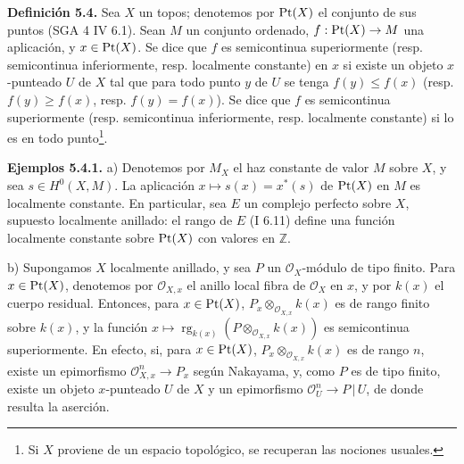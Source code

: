 \providecommand{\sisi}[2]{#2}

\textbf{Definición 5.4.} Sea \(X\) un topos; denotemos por \(\operatorname{Pt}(X)\) el conjunto de sus puntos (SGA 4 IV 6.1). Sean \(M\) un conjunto ordenado, \(f:\operatorname{Pt}(X)\to M\) una aplicación, y \(x\in\operatorname{Pt}(X)\). Se dice que \(f\) es semicontinua superiormente (resp. semicontinua inferiormente, resp. localmente constante) en \(x\) si existe un objeto \(x\)-punteado \(U\) de \(X\) tal que para todo punto \(y\) de \(U\) se tenga \(f(y)\leq f(x)\) (resp. \(f(y)\geq f(x)\), resp. \(f(y)=f(x)\)). Se dice que \(f\) es semicontinua superiormente (resp. semicontinua inferiormente, \sisi{rep.}{resp.} localmente constante) si lo es en todo punto\footnote{Si \(X\) proviene de un espacio topológico, se recuperan las nociones usuales.}.

\textbf{Ejemplos 5.4.1.} a) Denotemos por \(M_X\) el haz constante de valor \(M\) sobre \(X\), y sea \(s\in H^0(X,M)\). La aplicación \(x\mapsto s(x)=x^*(s)\) de \(\operatorname{Pt}(X)\) en \(M\) es localmente constante. En particular, sea \(E\) un complejo perfecto sobre \(X\), supuesto localmente anillado: el rango de \(E\) (I 6.11) define una función localmente constante sobre \(\operatorname{Pt}(X)\) con valores en \(\mathbb Z\).

b) Supongamos \(X\) localmente anillado, y sea \(P\) un \(\mathcal O_X\)-módulo de tipo finito. Para \(x\in\operatorname{Pt}(X)\), denotemos por \(\mathcal O_{X,x}\) el anillo local fibra de \(\mathcal O_X\) en \(x\), y por \(k(x)\) el cuerpo residual. Entonces, para \(x\in\operatorname{Pt}(X)\), \(P_x\otimes_{\mathcal O_{X,x}}k(x)\) es de rango finito sobre \(k(x)\), y la función \(x\mapsto\operatorname{rg}_{k(x)}(P\otimes_{\mathcal O_{X,x}}k(x))\) es semicontinua superiormente. En efecto, si, para \(x\in\operatorname{Pt}(X)\), \(P_x\otimes_{\mathcal O_{X,x}}k(x)\) es de rango \(n\), existe un epimorfismo \(\mathcal O_{X,x}^n\to P_x\) según Nakayama, y, como \(P\) es de tipo finito, existe un objeto \(x\)-punteado \(U\) de \(X\) y un epimorfismo \(\mathcal O_U^n\to P\,|\,U\), de donde resulta la aserción.

